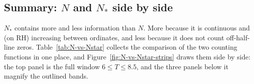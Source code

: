 \documentclass[11pt]{article}
\theoremstyle{definition}
\begin{document}
\subsection{Summary: \texorpdfstring{$N$ and $N_{\ast}$}{N and N*} side by side}
\label{sec:counting-summary}

$N_{\ast}$ contains more and less information than $N$. More because it is
continuous and (on RH) increasing between ordinates, and less because it does not
count off-half-line zeros. Table~\ref{tab:N-vs-Nstar} collects the comparison
of the two counting functions in one place, and
Figure~\ref{fig:N-vs-Nstar-strips} draws them side by side: the top panel is
the full window $6\leq T\leq8.5$, and the three panels below it magnify the
outlined bands.
\end{document}
